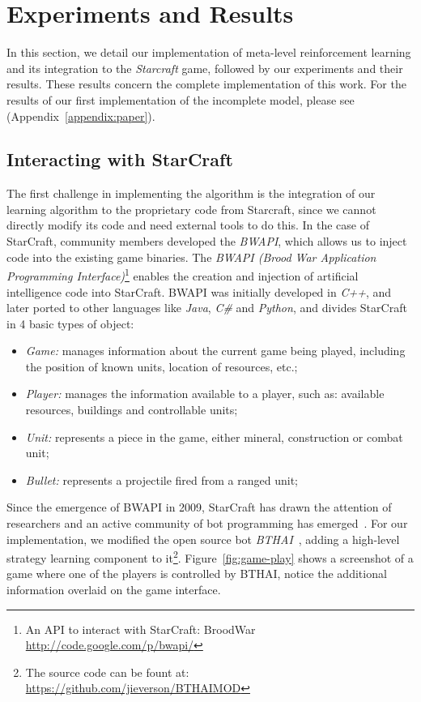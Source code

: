 \chapter{Experiments and Results}
\label{chapter:results}

In this section, we detail our implementation of meta-level reinforcement learning and its integration to the \emph{Starcraft} game, followed by our experiments and their results. 
These results concern the complete implementation of this work.
For the results of our first implementation of the incomplete model, please see~\cite{mypaper} (Appendix~\ref{appendix:paper}).



\section{Interacting with StarCraft}
\label{sec:bwapi}

The first challenge in implementing the algorithm is the integration of our learning algorithm to the proprietary code from Starcraft, since we cannot directly modify its code and need external tools to do this. 
In the case of StarCraft, community members developed the \textit{BWAPI}, which allows us to inject code into the existing game binaries. 
The \textit{BWAPI (Brood War Application Programming Interface)}\footnote{An API to interact with StarCraft: BroodWar \url{http://code.google.com/p/bwapi/}} enables the creation and injection of artificial intelligence code into StarCraft. 
BWAPI was initially developed in \textit{C++}, and later ported to other languages like \textit{Java}, \textit{C\#} and \textit{Python}, and divides StarCraft in 4 basic types of object:


\begin{itemize}
\item \textit{Game:} manages information about the current game being played, 
including the position of known units, location of resources, etc.;
\item \textit{Player:} manages the information available to a player, such as: 
available resources, buildings and controllable units;
\item \textit{Unit:} represents a piece in the game, either mineral, construction or combat unit;
\item \textit{Bullet:} represents a projectile fired from a ranged unit;
\end{itemize}

Since the emergence of BWAPI in 2009, StarCraft has drawn the attention of researchers and an active community of bot programming has emerged~\cite{buro2012real}. 
For our implementation, we modified the open source bot \textit{BTHAI}~\cite{hagelback2012potential},
adding a high-level strategy learning component to it\footnote{The source code can be fount at: \url{https://github.com/jieverson/BTHAIMOD}}.
Figure~\ref{fig:game-play} shows a screenshot of a game where one of the players is controlled by BTHAI, notice the additional information overlaid on the game interface. 

